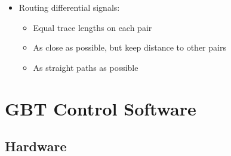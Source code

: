 \documentclass[aspectratio=43]{beamer}
\makeatletter
\newenvironment{backgroundblock}[2]{%
  \global\setbox\@backgroundblock=\vbox\bgroup%
    \unvbox\@backgroundblock%
    \vbox to0pt\bgroup\vskip#2\hbox to0pt\bgroup\hskip#1\relax%
}{\egroup\egroup\egroup}
\makeatother
\begin{document}
{\begin{frame}[t]
\begin{itemize}
\item Routing differential signals:
	\begin{itemize}
	\item Equal trace lengths on each pair
	\item As close as possible, but keep distance to other pairs
	\item As straight paths as possible
	\end{itemize}
\end{itemize}

\end{frame}

\section{GBT Control Software}
\subsection{Hardware}
}
\end{document}
